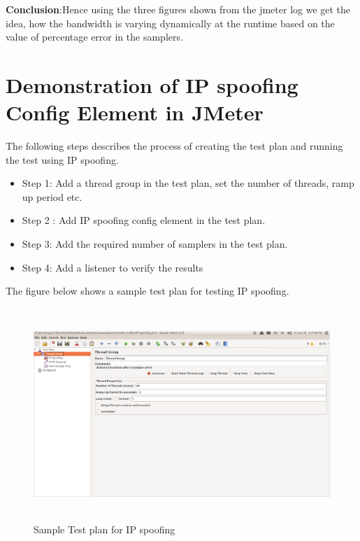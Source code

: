 \documentclass[12pt]{book}
\begin{document}
  \textbf{Conclusion}:Hence using the three figures shown from the jmeter log we get the idea, how the bandwidth is
  varying dynamically at the runtime based on the value of percentage error in the samplers.

  \section{Demonstration of IP spoofing Config Element in JMeter}
  The following steps describes the process of creating the test plan and running the test using IP spoofing.\\
  \begin{itemize}
   \item Step 1: Add a thread group in the test plan, set the number of  threads, ramp up period etc.\\
   \item Step 2 : Add IP spoofing config element in the test plan.\\
   \item Step 3: Add the required number of samplers in the test plan.\\
   \item Step 4: Add a listener to verify the results\\
  \end{itemize}

  The figure below shows a sample test plan for testing IP spoofing.
   \begin{figure}[H]
   \centering
   \includegraphics[width=15cm, height=8cm]{images/ip_81}
   \caption{Sample Test plan for IP spoofing \label{fig:fig84_JMeter}}
  \end{figure}
  
\end{document}
